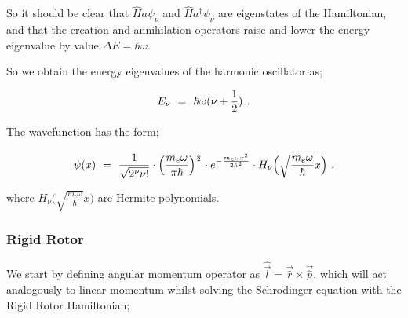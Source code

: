 \documentclass{article}
\begin{document}
So it should be clear that \begin{math} \hat{H} a \psi_\nu \end{math} and  \begin{math} \hat{H} a^{\dagger} \psi_\nu \end{math} are eigenstates of the Hamiltonian, and that the creation and annihilation operators raise and lower the energy eigenvalue by value \begin{math} \Delta E = \hbar \omega \end{math}. 

So we obtain the energy eigenvalues of the harmonic oscillator as;

\begin{equation} \label{eq:256}
E_\nu \hspace{0.125cm} = \hspace{0.125cm} \hbar \omega ( \nu + \frac{1}{2} ) \hspace{0.125cm} .
\end{equation}

The wavefunction has the form;

\begin{equation} \label{eq:256}
\psi(x) \hspace{0.125cm} = \hspace{0.125cm} \frac{1}{\sqrt{2^{\nu} \nu !}}\cdot\Big( \frac{m_e \omega}{\pi \hbar} \Big)^{\frac{1}{2}}\cdot e^{-\frac{m_e \omega x^2}{2 \hbar^{2}}}\cdot H_{\nu}\Big(\sqrt{\frac{m_e \omega}{\hbar}} x \Big) \hspace{0.125cm} .
\end{equation}

where  \begin{math} H_{\nu}\Big(\sqrt{\frac{m_e \omega}{\hbar}} x \Big) \end{math} are Hermite polynomials. 




\subsubsection{Rigid Rotor}

We start by defining angular momentum operator as \begin{math} \hat{\vec{l}} = \vec{\hat{r}}\times\vec{\hat{p}} \end{math}, which will act analogously to linear momentum whilst solving the Schrodinger equation with the Rigid Rotor Hamiltonian;
\end{document}
